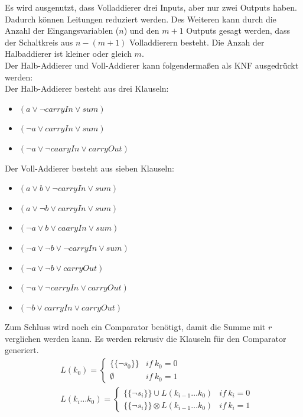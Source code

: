 \documentclass[a4,abstract=on]{scrartcl}
\begin{document}
Es wird ausgenutzt, dass Volladdierer drei Inputs, aber nur zwei Outputs haben. Dadurch können Leitungen reduziert werden. Des Weiteren kann durch die Anzahl der Eingangsvariablen ($n$) und den $m+1$ Outputs gesagt werden, dass der Schaltkreis aus $n-(m+1)$ Volladdierern besteht. Die Anzah der Halbaddierer ist kleiner oder gleich $m$.\\

Der Halb-Addierer und Voll-Addierer kann folgendermaßen als KNF ausgedrückt werden:\\
Der Halb-Addierer besteht aus drei Klauseln:
\begin{itemize}
\item $(a \vee \neg carryIn \vee sum)$
\item $(\neg a \vee carryIn \vee sum)$
\item $(\neg a \vee \neg caaryIn \vee carryOut )$
\end{itemize}

Der Voll-Addierer besteht aus sieben Klauseln:
\begin{itemize}
\item $(a \vee b \vee \neg carryIn \vee sum)$
\item $( a \vee \neg b \vee carryIn \vee sum)$
\item $(\neg a \vee b \vee caaryIn \vee sum )$
\item $(\neg a \vee \neg b \vee \neg carryIn \vee sum)$
\item$(\neg a \vee \neg b \vee carryOut)$
\item$(\neg a \vee \neg carryIn \vee carryOut)$
\item$(\neg b \vee carryIn \vee carryOut)$
\end{itemize}

Zum Schluss wird noch ein Comparator benötigt, damit die Summe mit $r$ verglichen werden kann. Es werden rekrusiv die Klauseln für den Comparator generiert.
\begin{align*}
&L(k_0) = \begin{cases} \{\{\neg s_0\}\} & if{~}k_0 = 0\\ \emptyset & if{~}k_0=1\end{cases}\\
&L(k_i \dots k_0) = \begin{cases} \{\{\neg s_i\}\}\cup L(k_{i-1} \dots k_0) & if{~}k_i = 0\\  \{\{\neg s_i\}\}\otimes L(k_{i-1} \dots k_0) & if{~}k_i = 1\end{cases}
\end{align*}
\end{document}

